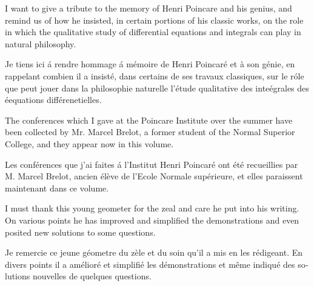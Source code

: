 \documentclass[crop=false,class=book,oneside]{standalone}
\begin{document}
\begin{paracol}{2}
{\begin{sloppypar}
            \end{sloppypar}}
            \par\hfill\par
            \switchcolumn
            I want to give a tribute to the memory of Henri Poincare and his genius, and remind us of how he insisted, in certain portions of his classic works, on the role in which the qualitative study of differential equations and integrals can play in natural philosophy.\par\hfill\par
            \switchcolumn
            \foreignlanguage{french}{
            Je tiens ici \'{a} rendre hommage \'{a} m\'{e}moire de Henri Poincar\'{e} et \`{a} son g\'{e}nie, en rappelant combien il a insist\'{e}, dans certains de ses travaux classiques, sur le r\'{o}le que peut jouer dans la philosophie naturelle l'\'{e}tude qualitative des inte\'{e}grales des \'{e}equations diff\'{e}renetielles.}
            \par\hfill\par
            \switchcolumn
            The conferences which I gave at the Poincare Institute over the summer have been collected by Mr. Marcel Brelot, a former student of the Normal Superior College, and they appear now in this volume.\par\hfill\par
            \switchcolumn
            \foreignlanguage{french}{
            Les conf\'{e}rences que j'ai faites \'{a} l'Institut Henri Poincar\'{e} ont \'{e}t\'{e} recueillies par M. Marcel Brelot, ancien \'{e}l\`{e}ve de l'Ecole Normale sup\'{e}rieure, et elles paraissent maintenant dans ce volume.}
            \par\hfill\par
            \switchcolumn
            I must thank this young geometer for the zeal and care he put into his writing. On various points he has improved and simplified the demonstrations and even posited new solutions to some questions.\par\hfill\par
            \hfill\par
            \switchcolumn
            \foreignlanguage{french}{
            Je remercie ce jeune g\'{e}ometre du z\`{e}le et du soin qu'il a mis en les r\'{e}digeant. En divers points il a am\'{e}lior\'{e} et simplifi\'{e} les d\'{e}monstrations et m\^{e}me indiqu\'{e} des solutions nouvelles de quelques questions.}
            \par\hfill\par

\end{paracol}
\end{document}
